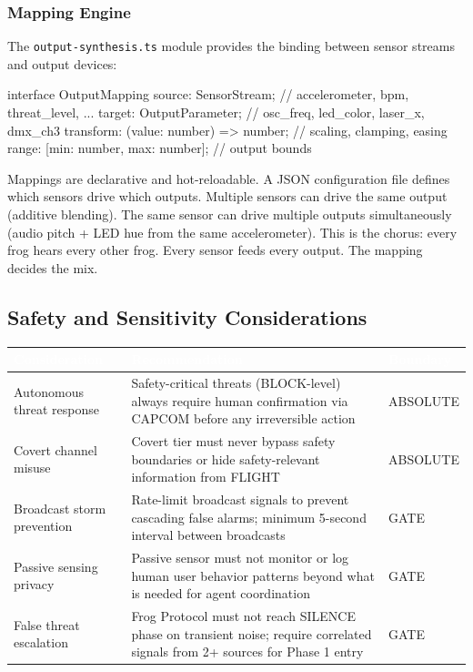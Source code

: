 \documentclass[11pt,letterpaper]{article}
\newcommand{\tableheader}[1]{\textbf{\sffamily\textcolor{white}{#1}}}
\begin{document}
\subsubsection{Mapping Engine}

The \texttt{output-synthesis.ts} module provides the binding between sensor streams and output devices:

\begin{asciibox}
interface OutputMapping {
  source: SensorStream;     // accelerometer, bpm, threat_level, ...
  target: OutputParameter;  // osc_freq, led_color, laser_x, dmx_ch3
  transform: (value: number) => number;  // scaling, clamping, easing
  range: [min: number, max: number];     // output bounds
}
\end{asciibox}

Mappings are declarative and hot-reloadable. A JSON configuration file defines which sensors drive which outputs. Multiple sensors can drive the same output (additive blending). The same sensor can drive multiple outputs simultaneously (audio pitch + LED hue from the same accelerometer). This is the chorus: every frog hears every other frog. Every sensor feeds every output. The mapping decides the mix.

\subsection{Safety and Sensitivity Considerations}

\begin{center}
\begin{tabularx}{\textwidth}{L{4cm}L{4cm}C{2.5cm}}
\toprule
{}
\tableheader{Consideration} & \tableheader{Recommendation} & \tableheader{Boundary} \\
\midrule
Autonomous threat response & Safety-critical threats (BLOCK-level) always require human confirmation via CAPCOM before any irreversible action & ABSOLUTE \\
Covert channel misuse & Covert tier must never bypass safety boundaries or hide safety-relevant information from FLIGHT & ABSOLUTE \\
Broadcast storm prevention & Rate-limit broadcast signals to prevent cascading false alarms; minimum 5-second interval between broadcasts & GATE \\
Passive sensing privacy & Passive sensor must not monitor or log human user behavior patterns beyond what is needed for agent coordination & GATE \\
False threat escalation & Frog Protocol must not reach SILENCE phase on transient noise; require correlated signals from 2+ sources for Phase 1 entry & GATE \\
\bottomrule
\end{tabularx}
\end{center}
\end{document}
